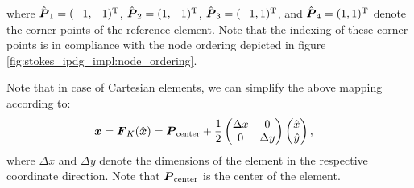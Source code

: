 \documentclass{scrreprt}
\begin{document}
where $\refVec{P}_1=(-1,-1)\transp$, $\refVec{P}_2=(1,-1)\transp$, $\refVec{P}_3=(-1,1)\transp$, and $\refVec{P}_4=(1,1)\transp$ denote the
corner points of the reference element. Note that the indexing of these corner points is in compliance with the node ordering depicted in
figure \ref{fig:stokes_ipdg_impl:node_ordering}.

Note that in case of Cartesian elements, we can simplify the above
mapping according to:
\begin{align}
\vec{x} = \mapping(\refVec{x})
&=
\vec{P}_{\textup{center}} +
\frac{1}{2}
\begin{pmatrix}
\Delta x & 0 \\
0 & \Delta y
\end{pmatrix}
\begin{pmatrix}
\hat{x} \\
\hat{y}
\end{pmatrix},
\end{align}
where $\Delta x$ and $\Delta y$ denote the dimensions of the element in the
respective coordinate direction.
Note that $\vec{P}_{\textup{center}}$ is the center of the element.
\end{document}
